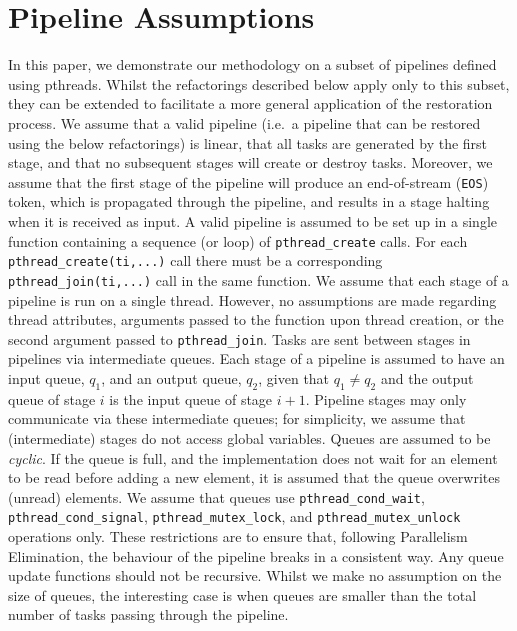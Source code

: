 \section{Pipeline Assumptions}
\label{sec:assumptions}

In this paper, we demonstrate our methodology on a subset of pipelines defined using pthreads. Whilst the refactorings described below apply only to this subset, they can be extended to facilitate a more general application of the restoration process.
%
We assume that a valid pipeline (i.e.\ a pipeline that can be restored using the below refactorings) is linear, that all tasks are generated by the first stage, and that no subsequent stages will create or destroy tasks. Moreover, we assume that the first stage of the pipeline will produce an end-of-stream (\lstinline{EOS}) token, which is propagated through the pipeline, and results in a stage halting when it is received as input.
%
A valid pipeline is assumed to be set up in a single function containing a sequence (or loop) of \lstinline|pthread_create| calls. For each \lstinline|pthread_create(ti,...)| call there must be a corresponding \lstinline|pthread_join(ti,...)| call in the same function.
We assume that each stage of a pipeline is run on a single thread. However, no assumptions are made regarding thread attributes, arguments passed to the function upon thread creation, or the second argument passed to \lstinline|pthread_join|.
%
Tasks are sent between stages in pipelines via intermediate queues.
%
Each stage of a pipeline is assumed to have an input queue, $q_1$, and an output queue, $q_2$, given that $q_1 \neq q_2$ and the output queue of stage $i$ is the input queue of stage $i+1$.
%
Pipeline stages may only communicate via these intermediate queues; for simplicity, we assume that (intermediate) stages do not access global variables.
%
Queues are assumed to be \emph{cyclic}. If the queue is full, and the implementation does not wait for an element to be read before adding a new element, it is assumed that the queue overwrites (unread) elements. We assume that queues use \lstinline|pthread_cond_wait|, \lstinline|pthread_cond_signal|, \lstinline|pthread_mutex_lock|, and \lstinline|pthread_mutex_unlock| operations only.
%
These restrictions are to ensure that, following Parallelism Elimination, the behaviour of the pipeline breaks in a consistent way. Any queue update functions should not be recursive.
%
Whilst we make no assumption on the size of queues, the interesting case is when queues are smaller than the total number of tasks passing through the pipeline.
